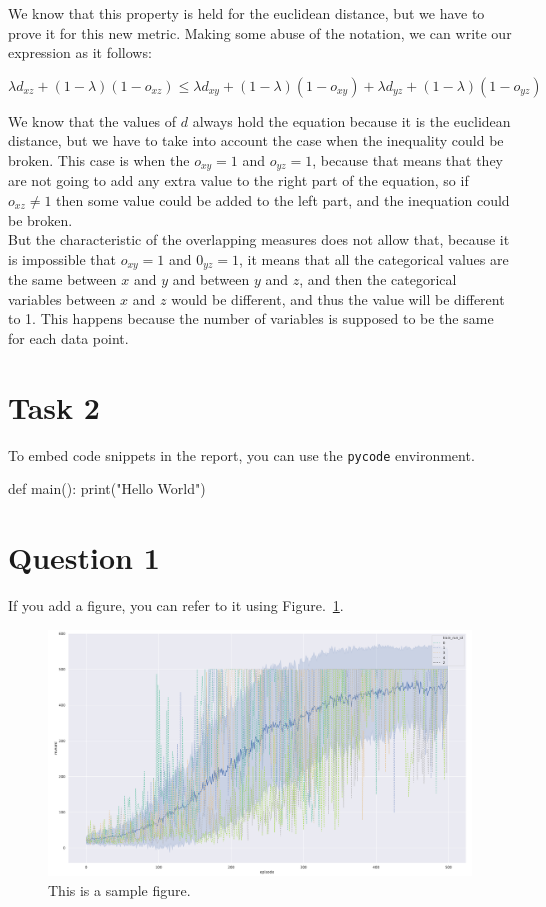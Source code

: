 \documentclass[12pt]{article}
\begin{document}
We know that this property is held for the euclidean distance, but we have to prove it for this new metric. Making some abuse of the notation, we can write our expression as it follows:

\begin{equation}
    \lambda d_{xz} + (1-\lambda)(1-o_{xz}) \leq \lambda d_{xy} + (1-\lambda)(1-o_{xy}) + \lambda d_{yz} + (1-\lambda)(1-o_{yz}) 
\end{equation}

We know that the values of $d$ always hold the equation because it is the euclidean distance, but we have to take into account the case when the inequality could be broken. This case is when the $o_{xy}=1$ and $o_{yz}=1$, because that means that they are not going to add any extra value to the right part of the equation, so if $o_{xz} \neq 1$ then some value could be added to the left part, and the inequation could be broken. \\

But the characteristic of the overlapping measures does not allow that, because it is impossible that $o_{xy}=1$ and $0_{yz}=1$, it means that all the categorical values are the same between $x$ and $y$ and between $y$ and $z$, and then the categorical variables between $x$ and $z$ would be different, and thus the value will be different to 1. This happens because the number of variables is supposed to be the same for each data point.

\section{Task 2}
To embed code snippets in the report, you can use the \texttt{pycode} environment.

\begin{pycode}
def main():
    print("Hello World")
\end{pycode}

\section{Question 1}

If you add a figure, you can refer to it using Figure.~\ref*{fig:fig1}.

\begin{figure}[h] 
	\centering  %
    \includegraphics[width=0.3\columnwidth]{img/training.pdf}
	\caption{This is a sample figure.}
	\label{fig:fig1}
\end{figure}


\end{document}
